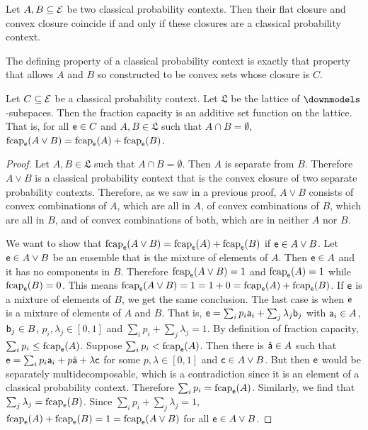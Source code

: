 \begin{mathSection}
\begin{conj}
	Let $A, B \subseteq \Ens$ be two classical probability contexts. Then their flat closure and convex closure coincide if and only if these closures are a classical probability context.
\end{conj}

\begin{conj}
	The defining property of a classical probability context is exactly that property that allows $A$ and $B$ so constructed to be convex sets whose closure is $C$.
\end{conj}

\begin{prop}
	Let $C \subseteq \Ens$ be a classical probability context. Let $\mathfrak{L}$ be the lattice of $\separate$-subspaces. Then the fraction capacity is an additive set function on the lattice. That is, for all $\ens \in C$ and $A, B \in \mathfrak{L}$ such that $A \cap B = \emptyset$,  $\fcap_{\ens}(A \vee B) = \fcap_{\ens}(A) + \fcap_{\ens}(B)$.
\end{prop}

\begin{proof}
	Let $A, B\in \mathfrak{L}$ such that $A \cap B = \emptyset$. Then $A$ is separate from $B$. Therefore $A \vee B$ is a classical probability context that is the convex closure of two separate probability contexts. Therefore, as we saw in a previous proof, $A \vee B$ consists of convex combinations of $A$, which are all in $A$, of convex combinations of $B$, which are all in $B$, and of convex combinations of both, which are in neither $A$ nor $B$.
	
	We want to show that $\fcap_{\ens}(A \vee B) = \fcap_{\ens}(A) + \fcap_{\ens}(B)$ if $\ens \in A \vee B$. Let $\ens \in A \vee B$ be an ensemble that is the mixture of elements of $A$. Then $\ens \in A$ and it has no components in $B$. Therefore $\fcap_{\ens}(A \vee B) = 1$ and $\fcap_{\ens}(A) = 1$ while $\fcap_{\ens}(B) = 0$. This means $\fcap_{\ens}(A \vee B) = 1 = 1 + 0 = \fcap_{\ens}(A) + \fcap_{\ens}(B)$. If $\ens$ is a mixture of elements of $B$, we get the same conclusion. The last case is when $\ens$ is a mixture of elements of $A$ and $B$. That is, $\ens = \sum_i p_i \ens[a]_i + \sum_j \lambda_j \ens[b]_j$ with $\ens[a]_i \in A$, $\ens[b]_j \in B$, $p_i, \lambda_j \in [0,1]$ and $\sum_i p_i + \sum_j \lambda_j = 1$. By definition of fraction capacity, $\sum_i p_i \leq \fcap_{\ens}(A)$. Suppose $\sum_i p_i < \fcap_{\ens}(A)$. Then there is $\hat{\ens[a]} \in A$ such that $\ens = \sum_i p_i \ens[a]_i + p \hat{\ens[a]} + \lambda \ens[c]$ for some $p,\lambda \in [0,1]$ and $\ens[c] \in A \vee B$. But then $\ens$ would be separately multidecomposable, which is a contradiction since it is an element of a classical probability context. Therefore $\sum_i p_i = \fcap_{\ens}(A)$. Similarly, we find that $\sum_j \lambda_j = \fcap_{\ens}(B)$. Since $\sum_i p_i + \sum_j \lambda_j = 1$, $\fcap_{\ens}(A) + \fcap_{\ens}(B) = 1 = \fcap_{\ens}(A \vee B)$ for all $\ens \in A \vee B$.
	

\end{proof}
\end{mathSection}
